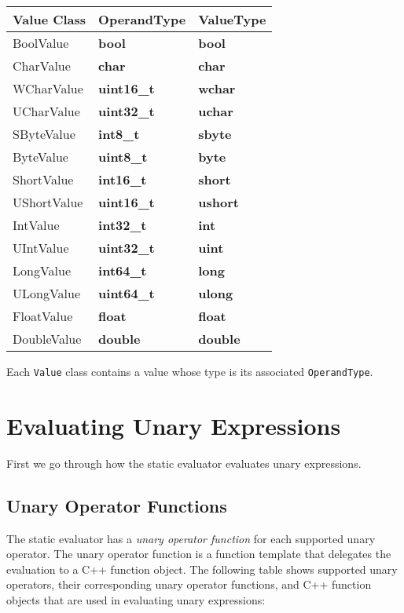 \documentclass[a4paper,oneside,11pt]{book}
\theoremstyle{definition}
\begin{document}
\begin{flushleft}
\begin{supertabular}{lll}
\textbf{Value Class}& \textbf{OperandType}& \textbf{ValueType}\\
\hline
BoolValue& \textbf{bool}& \textbf{bool}\\
CharValue& \textbf{char}& \textbf{char}\\
WCharValue& \textbf{uint16_t}& \textbf{wchar}\\
UCharValue& \textbf{uint32_t}& \textbf{uchar}\\
SByteValue& \textbf{int8_t}& \textbf{sbyte}\\
ByteValue& \textbf{uint8_t}& \textbf{byte}\\
ShortValue& \textbf{int16_t}& \textbf{short}\\
UShortValue& \textbf{uint16_t}& \textbf{ushort}\\
IntValue& \textbf{int32_t}& \textbf{int}\\
UIntValue& \textbf{uint32_t}& \textbf{uint}\\
LongValue& \textbf{int64_t}& \textbf{long}\\
ULongValue& \textbf{uint64_t}& \textbf{ulong}\\
FloatValue& \textbf{float}& \textbf{float}\\
DoubleValue& \textbf{double}& \textbf{double}\\
\hline
\end{supertabular}
\end{flushleft}

Each \verb|Value| class contains a value whose type is its associated \verb|OperandType|.

\section{Evaluating Unary Expressions}

First we go through how the static evaluator evaluates unary expressions.

\subsection{Unary Operator Functions}

The static evaluator has a \emph{unary operator function} for each supported unary operator.
The unary operator function is a function template that delegates the evaluation to a C++ function object.
The following table shows supported unary operators, their corresponding unary operator functions, and
C++ function objects that are used in evaluating unary expressions:
\end{document}
